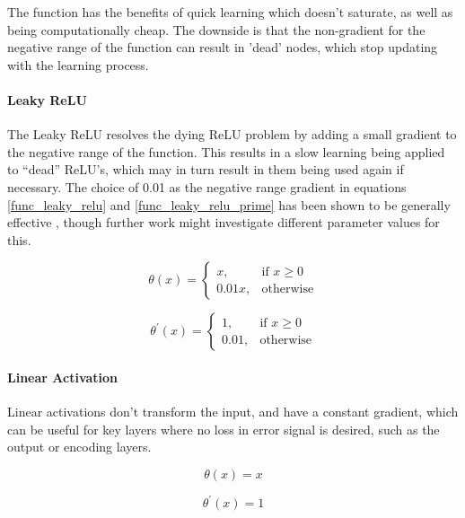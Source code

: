 \documentclass[a4paper,11pt,oneside]{article}
\theoremstyle{plain}
\theoremstyle{definition}
\begin{document}
	The function has the benefits of quick learning which doesn't saturate, as well as being computationally cheap. The downside is that the non-gradient for the negative range of the function can result in 'dead' nodes, which stop updating with the learning process.
	
	\paragraph{Leaky ReLU}
	
	The Leaky ReLU resolves the dying ReLU problem by adding a small gradient to the negative range of the function. This results in a slow learning being applied to ``dead'' ReLU's, which may in turn result in them being used again if necessary. The choice of 0.01 as the negative range gradient in equations \eqref{func_leaky_relu} and \eqref{func_leaky_relu_prime} has been shown to be generally effective \citep{Maas}, though further work might investigate different parameter values for this.
	
	\begin{equation}\label{func_leaky_relu}
	\end{equation}
	\[
	\theta(x)= 
	\begin{cases}
	x,& \text{if } x\geq 0\\
	0.01x,              & \text{otherwise}
	\end{cases}
	\]
	
	\begin{equation}\label{func_leaky_relu_prime}
	\end{equation}
	\[
	\theta^\prime(x)= 
	\begin{cases}
	1,& \text{if } x\geq 0\\
	0.01,              & \text{otherwise}
	\end{cases}
	\]
	
	\paragraph{Linear Activation}
	
	Linear activations don't transform the input, and have a constant gradient, which can be useful for key layers where no loss in error signal is desired, such as the output or encoding layers.
	
	\begin{equation}\label{func_linear}
	\theta(x) = x
	\end{equation}
	
	\begin{equation}\label{func_linear_prime}
	\theta^\prime(x) = 1
	\end{equation}
	
\end{document}
